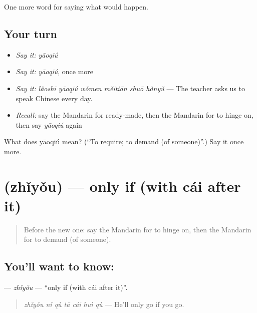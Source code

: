 \begin{grammarlens}[title={What you've built}]
One more word for saying what would happen.
\end{grammarlens}

\subsection*{Your turn}
\begin{itemize}
\raggedright
  \item \emph{Say it:} \emph{yāoqiú}
  \item \emph{Say it:} \emph{yāoqiú}, once more
  \item \emph{Say it:} \emph{lǎoshī yāoqiú wǒmen měitiān shuō hànyǔ} — The teacher asks us to speak Chinese every day.
  \item \emph{Recall:} say the Mandarin for ready-made, then the Mandarin for to hinge on, then say \emph{yāoqiú} again
\end{itemize}

\begin{tcolorbox}[breakable,colback=teal!4,colframe=teal!35!black,title={Before you move on}]
What does yāoqiú mean? (\textquotedblleft{}To require; to demand (of someone)\textquotedblright{}.) Say it once more.
\end{tcolorbox}
\section[\texorpdfstring{\zh{只有} (zhǐyǒu)}{只有 (zhǐyǒu)}]{ (zhǐyǒu) — only if (with cái after it)}

\label{lesson:ZH-C399-zhiyou}



\begin{quote}
Before the new one: say the Mandarin for to hinge on, then the Mandarin for to demand (of someone).
\end{quote}

\subsection*{You'll want to know: }
\textbf{} — \emph{zhǐyǒu} — \textquotedblleft{}only if (with cái after it)\textquotedblright{}.

\begin{quote}
\textbf{} \emph{zhǐyǒu nǐ qù tā cái huì qù} — He'll only go if you go.
\end{quote}

